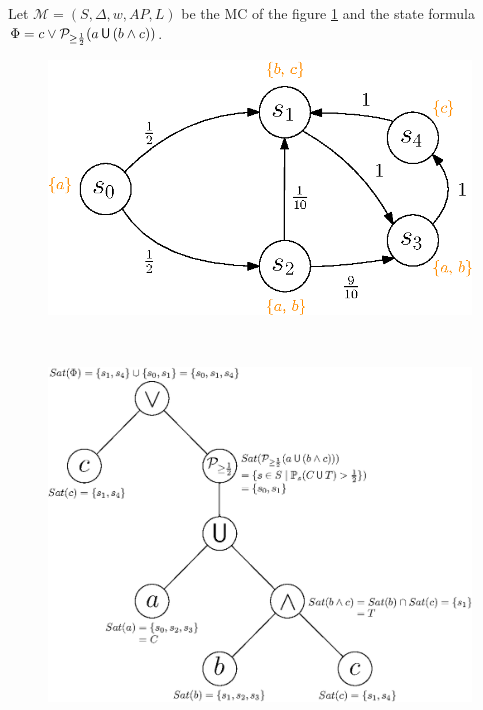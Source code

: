 \begin{example}
  Let $\mathcal{M}=(S, \Delta, w, AP, L)$ be the MC of the figure \ref{CUTexample2} and the state formula $\Phi = c \vee \mathcal{P}_{\geq \frac{1}{2}}(a \,\text{\sffamily U}\, (b \wedge c))$.
  \begin{figure}[h!]
  \begin{minipage}{0.4\linewidth}
    \centering
    \includegraphics[width=\linewidth]{resources/CUTexample2}
    \captionsetup{justification=centering}
    \label{CUTexample2}
  \end{minipage}
    $ \quad $
  \begin{minipage}{0.6\linewidth}
    \centering
    \includegraphics[width=\linewidth]{resources/parse-tree}

\end{minipage}
\end{figure}
\end{example}

